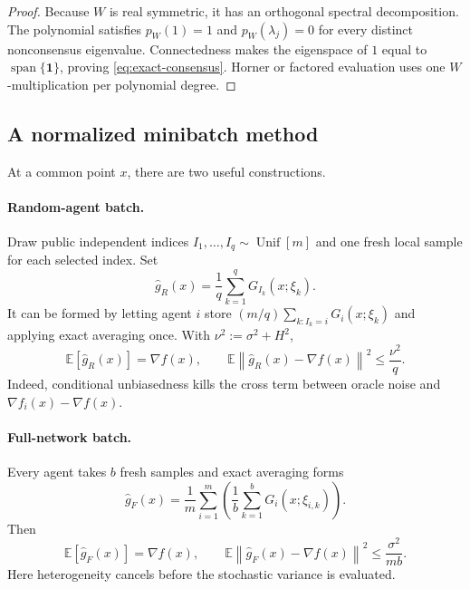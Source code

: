 \documentclass[11pt,a4paper]{article}
\newcommand{\E}{\mathbb{E}}
\newcommand{\norm}[1]{\left\lVert #1\right\rVert}
\newcommand{\one}{\mathbf{1}}
\theoremstyle{remark}
\begin{document}
\begin{proof}
Because $W$ is real symmetric, it has an orthogonal spectral decomposition.
The polynomial satisfies $p_W(1)=1$ and $p_W(\lambda_j)=0$ for every distinct
nonconsensus eigenvalue.  Connectedness makes the eigenspace of $1$ equal to
$\operatorname{span}\{\one\}$, proving \eqref{eq:exact-consensus}.  Horner
or factored evaluation uses one $W$-multiplication per polynomial degree.
\end{proof}

\subsection{A normalized minibatch method}
At a common point $x$, there are two useful constructions.

\paragraph{Random-agent batch.}
Draw public independent indices $I_1,\ldots,I_q\sim\operatorname{Unif}[m]$ and
one fresh local sample for each selected index.  Set
\begin{equation}
 \widehat g_R(x)=\frac1q\sum_{k=1}^q G_{I_k}(x;\xi_k).
 \label{eq:random-agent-estimator}
\end{equation}
It can be formed by letting agent $i$ store
$(m/q)\sum_{k:I_k=i}G_i(x;\xi_k)$ and applying exact averaging once.  With
$\nu^2:=\sigma^2+H^2$,
\begin{equation}
 \E[\widehat g_R(x)]=\nabla f(x),
 \qquad
 \E\norm{\widehat g_R(x)-\nabla f(x)}^2\le\frac{\nu^2}{q}.
 \label{eq:random-agent-variance}
\end{equation}
Indeed, conditional unbiasedness kills the cross term between oracle noise and
$\nabla f_i(x)-\nabla f(x)$.

\paragraph{Full-network batch.}
Every agent takes $b$ fresh samples and exact averaging forms
\begin{equation}
 \widehat g_F(x)=\frac1m\sum_{i=1}^m
 \left(\frac1b\sum_{k=1}^bG_i(x;\xi_{i,k})\right).
 \label{eq:full-network-estimator}
\end{equation}
Then
\begin{equation}
 \E[\widehat g_F(x)]=\nabla f(x),
 \qquad
 \E\norm{\widehat g_F(x)-\nabla f(x)}^2\le\frac{\sigma^2}{mb}.
 \label{eq:full-network-variance}
\end{equation}
Here heterogeneity cancels before the stochastic variance is evaluated.
\end{document}
